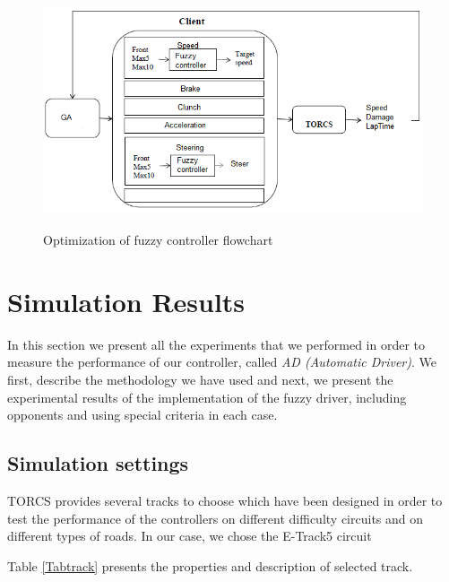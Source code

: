 \documentclass[runningheads,a4paper]{llncs}
\begin{document}
\begin{figure}[!ht]
	\begin{center}
		\includegraphics[width=13cm,height=7cm]{fig/mo}
	\end{center}
	\caption{Optimization of fuzzy controller flowchart }
\end{figure}	


	
	\section{Simulation Results}
	\label{sec:results}
	
	In this section we present all the experiments that we performed in order to measure the performance of our controller, called \textit{AD (Automatic Driver)}.
	We first, describe the methodology we have used and next, we present the experimental results of the implementation of the fuzzy driver, including opponents and using special criteria in each case.
	
	\subsection{Simulation settings}
	
	TORCS provides several tracks to choose which have been designed in order to test the performance of the controllers on different difficulty circuits and on different types of roads.
	In our case, we chose the E-Track5 circuit
	
	
	Table \ref{Tabtrack} presents the properties and description of selected track.
	
\end{document}
